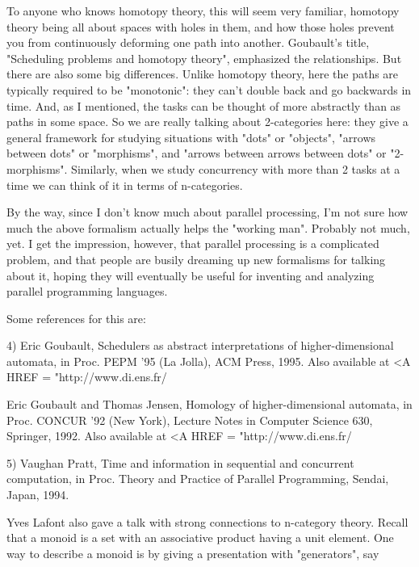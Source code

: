 To anyone who knows homotopy theory, this will seem very familiar,
homotopy theory being all about spaces with holes in them, and how those
holes prevent you from continuously deforming one path into another.
Goubault's title, "Scheduling problems and homotopy theory", emphasized
the relationships.  But there are also some big differences.  Unlike
homotopy theory, here the paths are typically required to be
"monotonic": they can't double back and go backwards in time.  And, as I
mentioned, the tasks can be thought of more abstractly than as paths in
some space.  So we are really talking about 2-categories here: they give
a general framework for studying situations with "dots" or "objects",
"arrows between dots" or "morphisms", and "arrows between arrows between
dots" or "2-morphisms".  Similarly, when we study concurrency with more
than 2 tasks at a time we can think of it in terms of n-categories.

By the way, since I don't know much about parallel processing, I'm not
sure how much the above formalism actually helps the "working man".
Probably not much, yet.  I get the impression, however, that parallel
processing is a complicated problem, and that people are busily dreaming
up new formalisms for talking about it, hoping they will eventually
be useful for inventing and analyzing parallel programming languages.

Some references for this are:

4) Eric Goubault, Schedulers as abstract interpretations of higher-dimensional
automata, in Proc. PEPM '95 (La Jolla), ACM Press, 1995.
Also available at <A HREF = "http://www.di.ens.fr/%

Eric Goubault and Thomas Jensen, Homology of higher-dimensional automata,
in Proc. CONCUR '92 (New York), Lecture Notes in Computer Science 630, Springer,
1992.   Also available at <A HREF = "http://www.di.ens.fr/%

5) Vaughan Pratt, Time and information in sequential and concurrent
computation, in Proc. Theory and Practice of Parallel Programming, Sendai,
Japan, 1994.

Yves Lafont also gave a talk with strong connections to n-category
theory.  Recall that a monoid is a set with an associative product
having a unit element.  One way to describe a monoid is by giving a
presentation with "generators", say

